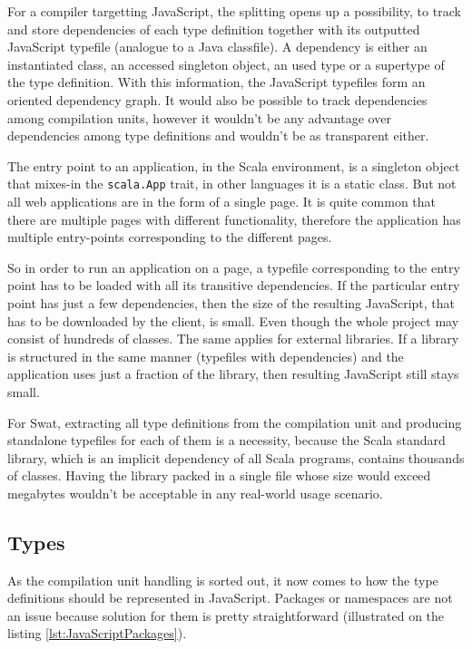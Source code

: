 \documentclass[12pt,a4paper]{report}
\begin{document}
For a compiler targetting JavaScript, the splitting opens up a possibility, to track and store dependencies of each type definition together with its outputted JavaScript typefile (analogue to a Java classfile). A dependency is either an instantiated class, an accessed singleton object, an used type or a supertype of the type definition. With this information, the JavaScript typefiles form an oriented dependency graph. It would also be possible to track dependencies among compilation units, however it wouldn't be any advantage over dependencies among type definitions and wouldn't be as transparent either.

The entry point to an application, in the Scala environment, is a singleton object that mixes-in the \texttt{scala.App} trait, in other languages it is a static class. But not all web applications are in the form of a single page. It is quite common that there are multiple pages with different functionality, therefore the application has multiple entry-points corresponding to the different pages. 

So in order to run an application on a page, a typefile corresponding to the entry point has to be loaded with all its transitive dependencies. If the particular entry point has just a few dependencies, then the size of the resulting JavaScript, that has to be downloaded by the client, is small. Even though the whole project may consist of hundreds of classes. The same applies for external libraries. If a library is structured in the same manner (typefiles with dependencies) and the application uses just a fraction of the library, then resulting JavaScript still stays small.

For Swat, extracting all type definitions from the compilation unit and producing standalone typefiles for each of them is a necessity, because the Scala standard library\cite{ScalaLibrary}, which is an implicit dependency of all Scala programs, contains thousands of classes. Having the library packed in a single file whose size would exceed megabytes wouldn't be acceptable in any real-world usage scenario. 

\subsection{Types}

As the compilation unit handling is sorted out, it now comes to how the type definitions should be represented in JavaScript. Packages or namespaces are not an issue because solution for them is pretty straightforward (illustrated on the listing \ref{lst:JavaScriptPackages}).
\end{document}
